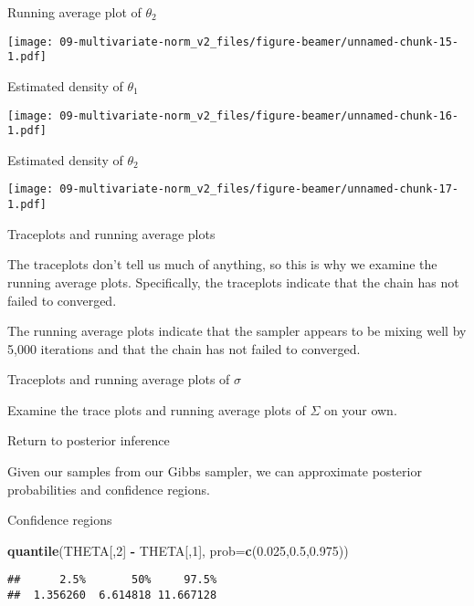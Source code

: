 \documentclass[ignorenonframetext,]{beamer}
\newenvironment{Shaded}{\begin{snugshade}}{\end{snugshade}}
\newcommand{\KeywordTok}[1]{\textcolor[rgb]{0.13,0.29,0.53}{\textbf{#1}}}
\newcommand{\DataTypeTok}[1]{\textcolor[rgb]{0.13,0.29,0.53}{#1}}
\newcommand{\DecValTok}[1]{\textcolor[rgb]{0.00,0.00,0.81}{#1}}
\newcommand{\FloatTok}[1]{\textcolor[rgb]{0.00,0.00,0.81}{#1}}
\newcommand{\StringTok}[1]{\textcolor[rgb]{0.31,0.60,0.02}{#1}}
\newcommand{\OperatorTok}[1]{\textcolor[rgb]{0.81,0.36,0.00}{\textbf{#1}}}
\newcommand{\NormalTok}[1]{#1}
\begin{document}
\begin{frame}{Running average plot of \(\theta_2\)}

\texttt{[image: 09-multivariate-norm\_v2\_files/figure-beamer/unnamed-chunk-15-1.pdf]}

\end{frame}

\begin{frame}{Estimated density of \(\theta_1\)}

\texttt{[image: 09-multivariate-norm\_v2\_files/figure-beamer/unnamed-chunk-16-1.pdf]}

\end{frame}

\begin{frame}{Estimated density of \(\theta_2\)}

\texttt{[image: 09-multivariate-norm\_v2\_files/figure-beamer/unnamed-chunk-17-1.pdf]}

\end{frame}

\begin{frame}{Traceplots and running average plots}

The traceplots don't tell us much of anything, so this is why we examine
the running average plots. Specifically, the traceplots indicate that
the chain has not failed to converged.

The running average plots indicate that the sampler appears to be mixing
well by 5,000 iterations and that the chain has not failed to converged.

\end{frame}

\begin{frame}{Traceplots and running average plots of \(\sigma\)}

Examine the trace plots and running average plots of \(\Sigma\) on your
own.

\end{frame}

\begin{frame}{Return to posterior inference}

Given our samples from our Gibbs sampler, we can approximate posterior
probabilities and confidence regions.

\end{frame}

\begin{frame}[fragile]{Confidence regions}

\begin{Shaded}
\begin{Highlighting}[]
\KeywordTok{quantile}\NormalTok{(THETA[,}\DecValTok{2}\NormalTok{] }\OperatorTok{-}\StringTok{ }\NormalTok{THETA[,}\DecValTok{1}\NormalTok{], }\DataTypeTok{prob=}\KeywordTok{c}\NormalTok{(}\FloatTok{0.025}\NormalTok{,}\FloatTok{0.5}\NormalTok{,}\FloatTok{0.975}\NormalTok{))}
\end{Highlighting}
\end{Shaded}

\begin{verbatim}
##      2.5%       50%     97.5% 
##  1.356260  6.614818 11.667128
\end{verbatim}

\end{frame}
\end{document}
